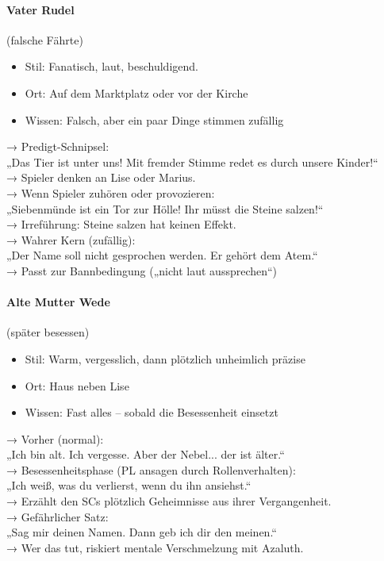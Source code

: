 \paragraph{Vater Rudel} (falsche Fährte)
\begin{itemize}
\item Stil: Fanatisch, laut, beschuldigend.
\item Ort: Auf dem Marktplatz oder vor der Kirche
\item Wissen: Falsch, aber ein paar Dinge stimmen zufällig
\end{itemize}
→ Predigt-Schnipsel:\\
„Das Tier ist unter uns! Mit fremder Stimme redet es durch unsere Kinder!“\\
→ Spieler denken an Lise oder Marius.\\
→ Wenn Spieler zuhören oder provozieren:\\
„Siebenmünde ist ein Tor zur Hölle! Ihr müsst die Steine salzen!“\\
→ Irreführung: Steine salzen hat keinen Effekt.\\
→ Wahrer Kern (zufällig):\\
„Der Name soll nicht gesprochen werden. Er gehört dem Atem.“\\
→ Passt zur Bannbedingung („nicht laut aussprechen“)
\paragraph{Alte Mutter Wede} (später besessen)
\begin{itemize}
\item Stil: Warm, vergesslich, dann plötzlich unheimlich präzise
\item Ort: Haus neben Lise
\item Wissen: Fast alles – sobald die Besessenheit einsetzt
\end{itemize}
→ Vorher (normal):\\
„Ich bin alt. Ich vergesse. Aber der Nebel... der ist älter.“\\
→ Besessenheitsphase (PL ansagen durch Rollenverhalten):\\
„Ich weiß, was du verlierst, wenn du ihn ansiehst.“\\
→ Erzählt den SCs plötzlich Geheimnisse aus ihrer Vergangenheit.\\
→ Gefährlicher Satz:\\
„Sag mir deinen Namen. Dann geb ich dir den meinen.“\\
→ Wer das tut, riskiert mentale Verschmelzung mit Azaluth.
